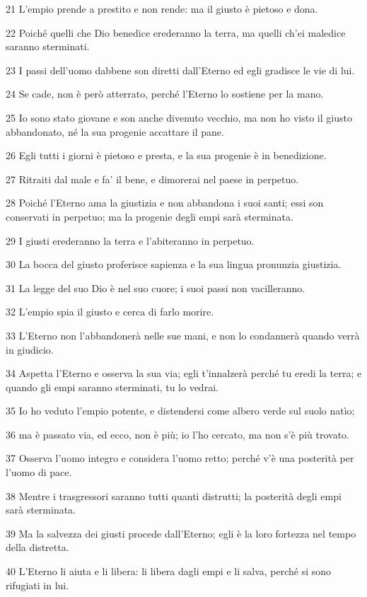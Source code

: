 \par 21 L'empio prende a prestito e non rende: ma il giusto è pietoso e dona.
\par 22 Poiché quelli che Dio benedice erederanno la terra, ma quelli ch'ei maledice saranno sterminati.
\par 23 I passi dell'uomo dabbene son diretti dall'Eterno ed egli gradisce le vie di lui.
\par 24 Se cade, non è però atterrato, perché l'Eterno lo sostiene per la mano.
\par 25 Io sono stato giovane e son anche divenuto vecchio, ma non ho visto il giusto abbandonato, né la sua progenie accattare il pane.
\par 26 Egli tutti i giorni è pietoso e presta, e la sua progenie è in benedizione.
\par 27 Ritraiti dal male e fa' il bene, e dimorerai nel paese in perpetuo.
\par 28 Poiché l'Eterno ama la giustizia e non abbandona i suoi santi; essi son conservati in perpetuo; ma la progenie degli empi sarà sterminata.
\par 29 I giusti erederanno la terra e l'abiteranno in perpetuo.
\par 30 La bocca del giusto proferisce sapienza e la sua lingua pronunzia giustizia.
\par 31 La legge del suo Dio è nel suo cuore; i suoi passi non vacilleranno.
\par 32 L'empio spia il giusto e cerca di farlo morire.
\par 33 L'Eterno non l'abbandonerà nelle sue mani, e non lo condannerà quando verrà in giudicio.
\par 34 Aspetta l'Eterno e osserva la sua via; egli t'innalzerà perché tu eredi la terra; e quando gli empi saranno sterminati, tu lo vedrai.
\par 35 Io ho veduto l'empio potente, e distendersi come albero verde sul suolo natìo;
\par 36 ma è passato via, ed ecco, non è più; io l'ho cercato, ma non s'è più trovato.
\par 37 Osserva l'uomo integro e considera l'uomo retto; perché v'è una posterità per l'uomo di pace.
\par 38 Mentre i trasgressori saranno tutti quanti distrutti; la posterità degli empi sarà sterminata.
\par 39 Ma la salvezza dei giusti procede dall'Eterno; egli è la loro fortezza nel tempo della distretta.
\par 40 L'Eterno li aiuta e li libera: li libera dagli empi e li salva, perché si sono rifugiati in lui.

